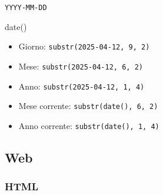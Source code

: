 \documentclass[
]{article}
\providecommand{\tightlist}{%
  \setlength{\itemsep}{0pt}\setlength{\parskip}{0pt}}
\begin{document}
\texttt{YYYY-MM-DD}

date()

\begin{itemize}
\tightlist
\item
  Giorno:
  \texttt{substr(\textquotesingle{}2025-04-12\textquotesingle{},\ 9,\ 2)}
\item
  Mese:
  \texttt{substr(\textquotesingle{}2025-04-12\textquotesingle{},\ 6,\ 2)}
\item
  Anno:
  \texttt{substr(\textquotesingle{}2025-04-12\textquotesingle{},\ 1,\ 4)}
\item
  Mese corrente: \texttt{substr(date(),\ 6,\ 2)}
\item
  Anno corrente: \texttt{substr(date(),\ 1,\ 4)}
\end{itemize}

\subsection{Web}\label{web}

\subsubsection{HTML}\label{html}
\end{document}
